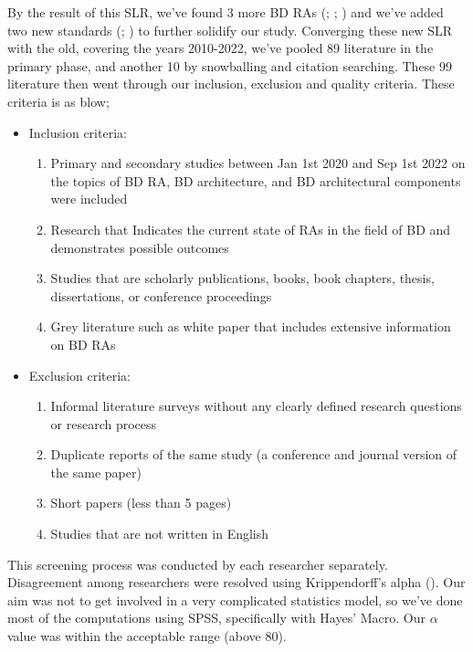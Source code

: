 \documentclass[review]{elsarticle}
\begin{document}
\begin{enumerate}
    By the result of this SLR, we've found 3 more BD RAs (\cite{AtaeiApsec}; \cite{castellanos2021smart}; \cite{sang2017simplifying}) and we've added two new standards (\cite{ISO20546}; \cite{ISO20547}) to further solidify our study. Converging these new SLR with the old, covering the years 2010-2022, we've pooled 89 literature in the primary phase, and another 10 by snowballing and citation searching. These 99 literature then went through our inclusion, exclusion and quality criteria. These criteria is as blow;

    \begin{itemize}
        \item Inclusion criteria:
        \begin{enumerate}
            \item Primary and secondary studies between Jan 1st 2020 and Sep 1st 2022 on the topics of BD RA, BD architecture, and BD architectural components were included
            \item Research that Indicates the current state of RAs in the field of BD and demonstrates possible outcomes
            \item Studies that are scholarly publications, books, book chapters, thesis, dissertations, or conference proceedings 
            \item Grey literature such as white paper that includes extensive information on BD RAs
        \end{enumerate}
        \item Exclusion criteria:
        \begin{enumerate}
            \item Informal literature surveys without any clearly defined research questions or research process
            \item Duplicate reports of the same study (a conference and journal version of the same paper)
            \item Short papers (less than 5 pages)
            \item Studies that are not written in English
        \end{enumerate}
    \end{itemize}
\end{enumerate}

This screening process was conducted by each researcher separately. Disagreement among researchers were resolved using Krippendorff’s alpha (\cite{krippendorff2011computing}). Our aim was not to get involved in a very complicated statistics model, so we've done most of the computations using SPSS, specifically with Hayes’ Macro. Our $ \alpha $ value was within the acceptable range (above 80). 
\end{document}
